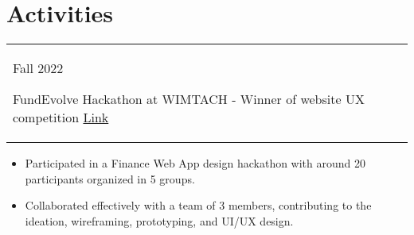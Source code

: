 \documentclass[a4paper,12pt]{article}
\begin{document}
\section{Activities}
\begin{tabularx}{\linewidth}{@{}l X@{}}	
Fall 2022 \
    \begin{minipage}[t]{0.875\linewidth}
    FundEvolve Hackathon at WIMTACH - Winner of website UX competition \hfill\href{https://anth0nywong.github.io/resume/activities/1.0_certificate.pdf}{Link}
 	\end{minipage}\\
\end{tabularx}
\begin{itemize}[nosep,after=\strut, leftmargin=1em, itemsep=3pt]
        \item Participated in a Finance Web App design hackathon with around 20 participants organized in 5 groups.
        \item Collaborated effectively with a team of 3 members, contributing to the ideation, wireframing, prototyping, and UI/UX design.
	\end{itemize}


\vfill
\end{document}
